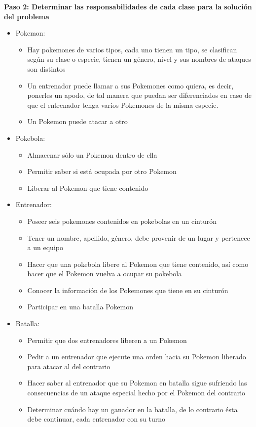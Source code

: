 \documentclass[a4paper,11pt]{report}
\begin{document}
\textbf{Paso 2: Determinar las responsabilidades de cada clase para la solución del problema}
\begin{itemize}
\item Pokemon: 

\begin{itemize}
\item Hay pokemones de varios tipos, cada uno tienen un tipo, se clasifican según su clase o especie, tienen un género, nivel y sus nombres de ataques son distintos
\item Un entrenador puede llamar a sus Pokemones como quiera, es decir, ponerles un apodo, de tal manera que puedan ser diferenciados en caso de que el entrenador tenga varios Pokemones de la misma especie.
\item Un Pokemon puede atacar a otro
\end{itemize}

\item Pokebola:

\begin{itemize}
\item Almacenar sólo un Pokemon dentro de ella
\item Permitir saber si está ocupada por otro Pokemon
\item Liberar al Pokemon que tiene contenido
\end{itemize}

\item Entrenador:
\begin{itemize}
\item Poseer seis pokemones contenidos en pokebolas en un cinturón
\item Tener un nombre, apellido, género, debe provenir de un lugar y pertenece a un equipo
\item Hacer que una pokebola libere al Pokemon que tiene contenido, así como hacer que el Pokemon vuelva a ocupar su pokebola
\item Conocer la información de los Pokemones que tiene en su cinturón
\item Participar en una batalla Pokemon
\end{itemize}

\item Batalla:
\begin{itemize}
\item Permitir que dos entrenadores liberen a un Pokemon
\item Pedir a un entrenador que ejecute una orden hacia su Pokemon liberado para atacar al del contrario
\item Hacer saber al entrenador que su Pokemon en batalla sigue sufriendo las consecuencias de un ataque especial hecho por el Pokemon del contrario
\item Determinar cuándo hay un ganador en la batalla, de lo contrario ésta debe continuar, cada entrenador con su turno
\end{itemize}


\end{itemize}
\end{document}
